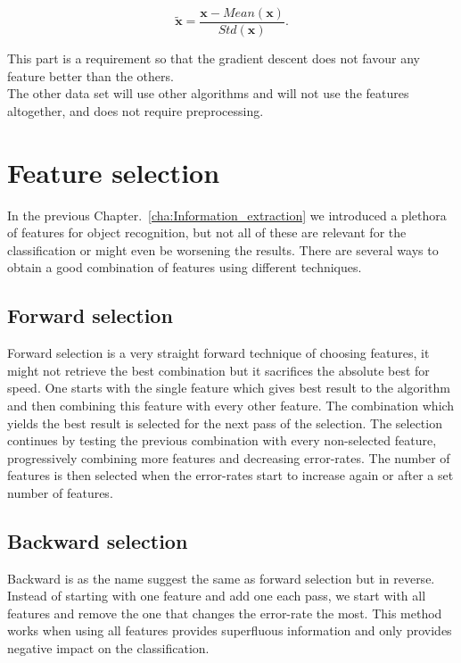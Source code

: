 \begin{equation}
    \tilde{\bm{x}} = \frac{\bm{x}-Mean(\bm{x})}{Std(\bm{x})}.
\end{equation}

This part is a requirement so that the gradient descent does not favour any feature better than the others.\\

 The other data set will use other algorithms and will not use the features altogether, and does not require preprocessing.

\section{Feature selection}

In the previous Chapter.~\ref{cha:Information_extraction} we introduced a plethora of features for object recognition, but not all of these are relevant for the classification or might even be worsening the results. There are several ways to obtain a good combination of features using different techniques.

\subsection{Forward selection}

Forward selection is a very straight forward technique of choosing features, it might not retrieve the best combination but it sacrifices the absolute best for speed. One starts with the single feature which gives best result to the algorithm and then combining this feature with every other feature. The combination which yields the best result is selected for the next pass of the selection. The selection continues by testing the previous combination with every non-selected feature, progressively combining more features and decreasing error-rates. The number of features is then selected when the error-rates start to increase again or after a set number of features.

\subsection{Backward selection}

Backward is as the name suggest the same as forward selection but in reverse. Instead of starting with one feature and add one each pass, we start with all features and remove the one that changes the error-rate the most. This method works when using all features provides superfluous information and only provides negative impact on the classification.

